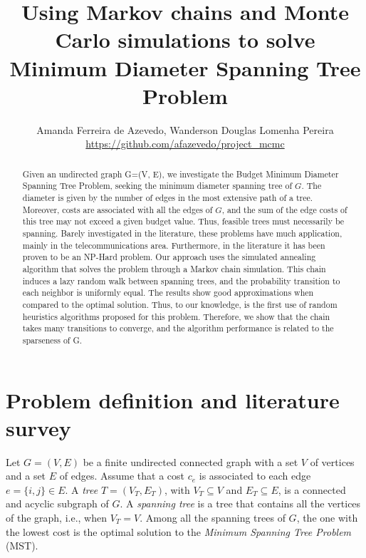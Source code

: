\documentclass[12pt]{article}
\title{Using Markov chains and Monte Carlo simulations to solve Minimum Diameter Spanning Tree Problem}
\author{Amanda Ferreira de Azevedo\inst{1}, Wanderson Douglas Lomenha Pereira\inst{1}\\
\url{https://github.com/afazevedo/project_mcmc}}
\begin{document}
 

\maketitle
                                                          
\begin{abstract}
        Given an undirected graph G=(V, E), we investigate the Budget Minimum Diameter Spanning Tree Problem, seeking the minimum diameter spanning tree of $G$. The diameter is given by the number of edges in the most extensive path of a tree. Moreover, costs are associated with all the edges of $G$, and the sum of the edge costs of this tree may not exceed a given budget value. Thus, feasible trees must necessarily be spanning. Barely investigated in the literature, these problems have much application, mainly in the telecommunications area. Furthermore, in the literature it has been proven to be an NP-Hard problem. Our approach uses the simulated annealing algorithm that solves the problem through a Markov chain simulation. This chain induces a lazy random walk between spanning trees, and the probability transition to each neighbor is uniformly equal. The results show good approximations when compared to the optimal solution. Thus, to our knowledge, is the first use of random heuristics algorithms proposed for this problem. Therefore, we show that the chain takes many transitions to converge, and the algorithm performance is related to the sparseness of G.
\end{abstract}
%     

\section{Problem definition and literature survey}

 Let $G = (V, E)$ be a finite undirected connected graph with a set $V$ of vertices and a set $E$ of edges. Assume that a cost $c_{e}$ is associated to each edge $e = \{i, j\} \in E$. A \emph{tree} $T = (V_T, E_T)$, with $ V_T \subseteq V $ and $E_T \subseteq E$, is a connected and acyclic subgraph of $G$. A \emph{spanning tree} is a tree that contains all the vertices of the graph, i.e., when $V_T = V$. Among all the spanning trees of $G$, the one with the lowest cost is the optimal solution to the \emph{Minimum Spanning Tree Problem} (MST).
\end{document}
